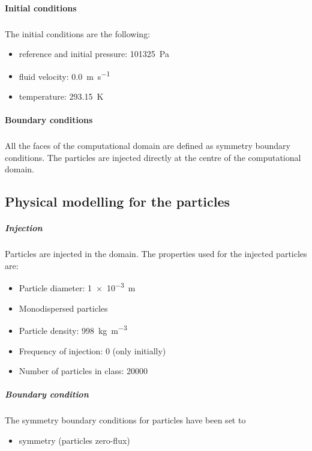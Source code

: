 \paragraph{Initial conditions}
\subparagraph{} The initial conditions are the following:
\begin{itemize}
 \item reference and initial pressure: \SI{101325}{Pa}
 \item fluid velocity: \SI{0.0}{m.s^{-1}}
 \item temperature: \SI{293.15}{K}
\end{itemize}

\paragraph{Boundary conditions}

\subparagraph{} All the faces of the computational domain are defined as symmetry boundary conditions. The particles are injected directly at the centre of the computational domain.

\subsection{Physical modelling for the particles}

\subparagraph{Injection} Particles are injected in the domain. The properties used for the injected particles are:

\begin{itemize}
 \item Particle diameter: \SI{1e-3}{m}
 \item Monodispersed particles
 \item Particle density: \SI{998}{kg.m^{-3}}
 \item Frequency of injection: 0 (only initially)
 \item Number of particles in class: \SI{20000}{}
\end{itemize}

\subparagraph{Boundary condition} The symmetry boundary conditions for particles have been set to

\begin{itemize}
 \item symmetry (particles zero-flux)
\end{itemize}

